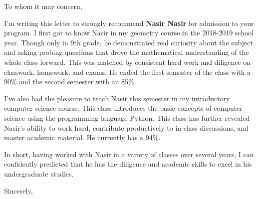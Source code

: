 \documentclass{letter}
\begin{document}
\begin{letter}{}
\opening{To whom it may concern,}

I'm writing this letter to strongly recommend  \textbf{Nasir Nasir} for admission to your program.  I first got to know Nasir in my geometry course in the 2018-2019 school year. Though only in 9th grade,  he  demonstrated real curiosity about the subject and asking probing questions that drove the mathematical understanding of the whole class forward. This was matched by consistent hard work and diligence on classwork, homework, and exams. He ended the first semester of the class with a 90\% and the second semester with an 85\%.  

I've also had the pleasure to teach Nasir this semester in my  introductory computer science course.  This class introduces  the basic concepts of computer science using the programming language Python.    This class has further revealed Nasir's ability to work hard, contribute productively to in-class discussions, and master academic material.  He currently has a 94\%.    

In short, having worked with Nasir in a variety of classes over several years, I can confidently predicted that he has the diligence and academic skills  to  excel in his undergraduate studies.

\closing{Sincerely,}

\end{letter}
\end{document}
